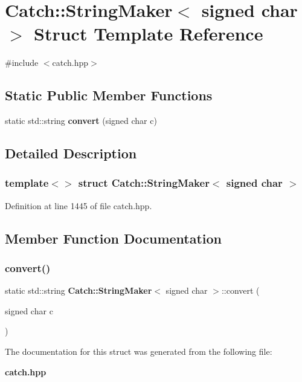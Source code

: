 \section{Catch\+::String\+Maker$<$ signed char $>$ Struct Template Reference}
\label{struct_catch_1_1_string_maker_3_01signed_01char_01_4}


{\ttfamily \#include $<$catch.\+hpp$>$}

\subsection*{Static Public Member Functions}
\begin{DoxyCompactItemize}
\item 
static std\+::string \textbf{ convert} (signed char c)
\end{DoxyCompactItemize}


\subsection{Detailed Description}
\subsubsection*{template$<$$>$\newline
struct Catch\+::\+String\+Maker$<$ signed char $>$}



Definition at line 1445 of file catch.\+hpp.



\subsection{Member Function Documentation}
\mbox{\label{struct_catch_1_1_string_maker_3_01signed_01char_01_4_a5ec41f32916539dc90130539db8222cf}} 
\subsubsection{convert()}
{\footnotesize\ttfamily static std\+::string \textbf{ Catch\+::\+String\+Maker}$<$ signed char $>$\+::convert (\begin{DoxyParamCaption}\item[{signed char}]{c }\end{DoxyParamCaption})\hspace{0.3cm}{\ttfamily [static]}}



The documentation for this struct was generated from the following file\+:\begin{DoxyCompactItemize}
\item 
\textbf{ catch.\+hpp}\end{DoxyCompactItemize}

